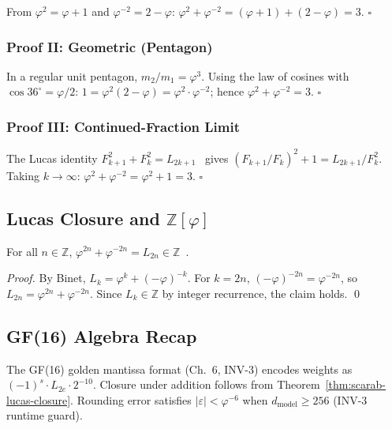 From $\varphi^{2}=\varphi+1$ and $\varphi^{-2}=2-\varphi$:
$\varphi^{2}+\varphi^{-2}=(\varphi+1)+(2-\varphi)=3$. $\square$

\subsubsection{Proof II: Geometric (Pentagon)}

In a regular unit pentagon, $m_{2}/m_{1}=\varphi^{3}$.
Using the law of cosines with $\cos 36^{\circ}=\varphi/2$:
$1=\varphi^{2}(2-\varphi)=\varphi^{2}\cdot\varphi^{-2}$;
hence $\varphi^{2}+\varphi^{-2}=3$. $\square$

\subsubsection{Proof III: Continued-Fraction Limit}

The Lucas identity $F_{k+1}^{2}+F_{k}^{2}=L_{2k+1}$~\cite{koshy_fib_lucas}
gives $(F_{k+1}/F_{k})^{2}+1=L_{2k+1}/F_{k}^{2}$.
Taking $k\to\infty$: $\varphi^{2}+\varphi^{-2}=\varphi^{2}+1=3$. $\square$

\subsection{Lucas Closure and \texorpdfstring{$\mathbb{Z}[\varphi]$}{Z[phi]}}
\label{sec:scarab-lucas}

\begin{theorem}
\label{thm:scarab-lucas-closure}
  For all $n\in\mathbb{Z}$,
  $\varphi^{2n}+\varphi^{-2n} = L_{2n} \in \mathbb{Z}$~\cite{koshy_fib_lucas}.
\end{theorem}

\begin{proof}
  By Binet, $L_{k}=\varphi^{k}+(-\varphi)^{-k}$.
  For $k=2n$, $(-\varphi)^{-2n}=\varphi^{-2n}$,
  so $L_{2n}=\varphi^{2n}+\varphi^{-2n}$.
  Since $L_{k}\in\mathbb{Z}$ by integer recurrence, the claim holds.
  \qed
\end{proof}

\subsection{GF(16) Algebra Recap}
\label{sec:scarab-gf16}

The GF(16) golden mantissa format (Ch.\ 6, INV-3) encodes weights as
$(-1)^{s}\cdot L_{2e}\cdot 2^{-10}$.
Closure under addition follows from
Theorem~\ref{thm:scarab-lucas-closure}.
Rounding error satisfies $|\varepsilon|<\varphi^{-6}$ when
$d_{\mathrm{model}}\geq 256$ (INV-3 runtime guard).


